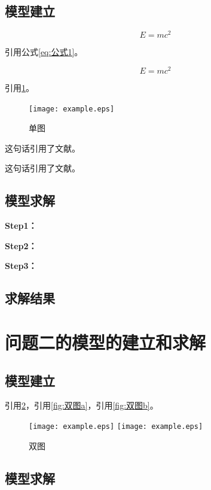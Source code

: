 \documentclass[withoutpreface,bwprint]{cumcmthesis}
\begin{document}
\subsection{模型建立}

$$
E = mc^2
$$

引用公式\cref{eq:公式1}。

\begin{equation}
\label{eq:公式1}
E = mc^2
\end{equation}

引用\cref{fig:单图}。

\begin{figure}[ht]
\centering
\texttt{[image: example.eps]}
\caption{单图}
\label{fig:单图}
\end{figure}

这句话引用了文献\cite{司守奎2011数学建模算法与应用}。

这句话引用了文献。

\subsection{模型求解}

\textbf{Step1：} 

\textbf{Step2：} 

\textbf{Step3：} 

\subsection{求解结果}



\section{问题二的模型的建立和求解}
\subsection{模型建立}

引用\cref{fig:双图}，引用\cref{fig:双图a}，引用\cref{fig:双图b}。

\begin{figure}[ht]
\centering
{}
{\texttt{[image: example.eps]}}
{\texttt{[image: example.eps]}}
\caption{双图}\label{fig:双图}
\end{figure} 

\subsection{模型求解}
\end{document}
